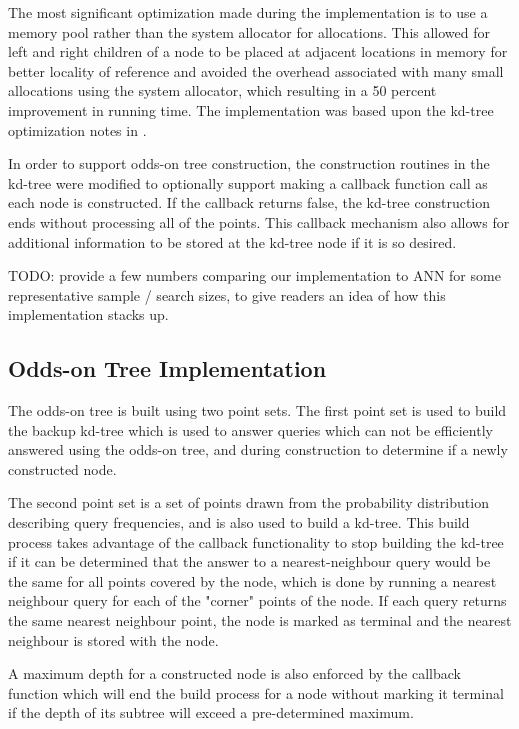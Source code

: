 \documentclass[mcs]{scsthesis}
\begin{document}
The most significant optimization made during the implementation is to use
a memory pool rather than the system allocator for allocations. This allowed
for left and right children of a node to be placed at adjacent locations in
memory for better locality of reference and avoided the overhead associated
with many small allocations using the system allocator, which resulting in a
50 percent improvement in running time. The implementation was based upon the
kd-tree optimization notes in \cite{physicallybasedrendering}.

In order to support odds-on tree construction, the construction routines in
the kd-tree were modified to optionally support making a callback function
call as each node is constructed. If the callback returns false, the kd-tree
construction ends without processing all of the points. This callback
mechanism also allows for additional information to be stored at the kd-tree
node if it is so desired.

TODO: provide a few numbers comparing our implementation to ANN for some
representative sample / search sizes, to give readers an idea of how this
implementation stacks up.

\subsection{Odds-on Tree Implementation}

The odds-on tree is built using two point sets. The first point set is used
to build the backup kd-tree which is used to answer queries which can not be
efficiently answered using the odds-on tree, and during construction to
determine if a newly constructed node.

The second point set is a set of points drawn from the probability distribution
describing query frequencies, and is also used to build a kd-tree. This build
process takes advantage of the callback functionality to stop building the
kd-tree if it can be determined that the answer to a nearest-neighbour query
would be the same for all points covered by the node, which is done by
running a nearest neighbour query for each of the "corner" points of the node.
If each query returns the same nearest neighbour point, the node is marked
as terminal and the nearest neighbour is stored with the node.

A maximum depth for a constructed node is also enforced by the callback
function which will end the build process for a node without marking it
terminal if the depth of its subtree will exceed a pre-determined maximum.
\end{document}
